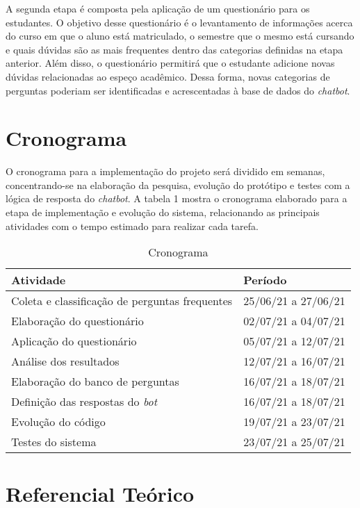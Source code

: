 \documentclass[12pt]{article}
\begin{document}
A segunda etapa é composta pela aplicação de um questionário para os estudantes. O objetivo desse questionário é o levantamento de informações acerca do curso em que o aluno está matriculado, o semestre que o mesmo está cursando e quais dúvidas são as mais frequentes dentro das categorias definidas na etapa anterior. Além disso, o questionário permitirá que o estudante adicione novas dúvidas relacionadas ao espeço acadêmico. Dessa forma, novas categorias de perguntas poderiam ser identificadas e acrescentadas à base de dados do {\itshape chatbot}.

\section{Cronograma} \label{sec:firstpage}

O cronograma para a implementação do projeto será dividido em semanas, concentrando-se na elaboração da pesquisa, evolução do protótipo e testes com a lógica de resposta do {\itshape chatbot}. A tabela 1 mostra o cronograma elaborado para a etapa de implementação e evolução do sistema, relacionando as principais atividades com o tempo estimado para realizar cada tarefa.


\begin{table}[h!]
\caption{Cronograma}
\label{table:1}
\begin{tabular}{ |p{8cm}||p{6cm}|  }
 \hline
Atividade & Período\\
 \hline
 Coleta e classificação de perguntas frequentes & 25/06/21 a 27/06/21  \\
 Elaboração do questionário & 02/07/21 a 04/07/21  \\
 Aplicação do questionário & 05/07/21 a 12/07/21  \\
 Análise dos resultados & 12/07/21 a 16/07/21  \\
 Elaboração do banco de perguntas & 16/07/21 a 18/07/21  \\
 Definição das respostas do {\itshape bot} & 16/07/21 a 18/07/21  \\
 Evolução do código & 19/07/21 a 23/07/21 \\
 Testes do sistema & 23/07/21 a 25/07/21  \\
 \hline
\end{tabular}
\end{table}

\section{ Referencial Teórico}
\end{document}

